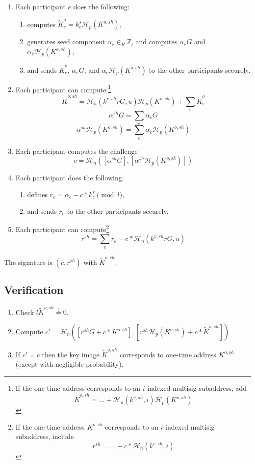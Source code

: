 \begin{enumerate}
    \item Each participant $e$ does the following:
    \begin{enumerate}
        \item computes $\tilde{K}^{o}_{e} = k^{s}_e \mathcal{H}_p(K^{o,sh})$,
        \item generates seed component $\alpha_e \in_R \mathbb{Z}_l$ and computes $\alpha_e G$ and $\alpha_e \mathcal{H}_p(K^{o,sh})$,
        \item and sends $\tilde{K}^{o}_{e}$, $\alpha_e G$, and $\alpha_e \mathcal{H}_p(K^{o,sh})$ to the other participants securely.
    \end{enumerate}
    \item Each participant can compute:\footnote{If the one-time address corresponds to an $i$-indexed multisig subaddress, add
    \[ \tilde{K}^{o,sh} = ... + \mathcal{H}_n(k^{v,sh},i) \mathcal{H}_p(K^{o,sh})\]}
    \[ \tilde{K}^{o,sh} = \mathcal{H}_n(k^{v,sh} r G, u) \mathcal{H}_p(K^{o,sh}) + \sum_e \tilde{K}^{o}_{e} \]
    \[ \alpha^{sh} G = \sum_e \alpha_{e} G\]
    \[ \alpha^{sh} \mathcal{H}_p(K^{o,sh}) = \sum_e \alpha_{e} \mathcal{H}_p(K^{o,sh})\]
    \item Each participant computes the challenge
    \[ c = \mathcal{H}_n([\alpha^{sh} G],[\alpha^{sh} \mathcal{H}_p(K^{o,sh})])\]
    \item Each participant does the following:
    \begin{enumerate}
        \item defines $r_e = \alpha_e - c*k^{s}_e \pmod l$,
        \item and sends $r_e$ to the other participants securely.
    \end{enumerate}
    \item Each participant can compute\footnote{If the one-time address $K^{o,sh}$ corresponds to an $i$-indexed multisig subaddress, include
    \[ r^{sh} = ... - c*\mathcal{H}_n(k^{v,sh},i)\]}
    \[ r^{sh} = \sum_e r_e - c*\mathcal{H}_n(k^{v,sh} r G, u)\]
\end{enumerate}

The signature is $(c,r^{sh})$ with $\tilde{K}^{o,sh}$.

\subsection*{Verification}

\begin{enumerate}
    \item Check $l \tilde{K}^{o,sh} \stackrel{?}{=} 0$.
    \item Compute $c' = \mathcal{H}_n([r^{sh} G + c*K^{o,sh}],[r^{sh} \mathcal{H}_p(K^{o,sh}) + c*\tilde{K}^{o,sh}])$
    \item If $c' = c$ then the key image $\tilde{K}^{o,sh}$ corresponds to one-time address $K^{o,sh}$ (except with negligible probability).
\end{enumerate}



